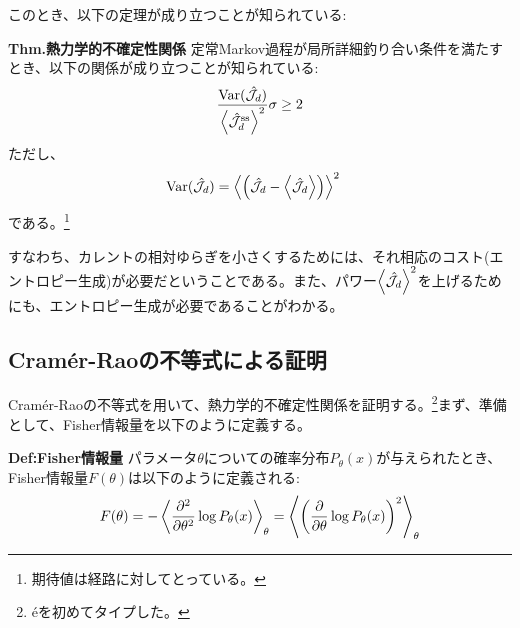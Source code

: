 \documentclass[a4paper,11pt]{jsarticle}
\numberwithin{equation}{section}
\begin{document}
このとき、以下の定理が成り立つことが知られている:

\begin{itembox}[l]{\textbf{Thm.熱力学的不確定性関係}}
    定常Markov過程が局所詳細釣り合い条件を満たすとき、以下の関係が成り立つことが知られている:
    \begin{align}
        \frac{\text{Var}(\hat{\mathcal{J}}_d)}{\ev{\hat{\mathcal{J}}_d^{\text{ss}}}^2} \sigma \geq 2
    \end{align}
    ただし、
    \begin{align}
        \text{Var}(\hat{\mathcal{J}}_d) &= \ev{\qty(\hat{\mathcal{J}}_d -\ev{\hat{\mathcal{J}_d}})}^2
    \end{align}
    である。\footnote{期待値は経路に対してとっている。}
\end{itembox}
すなわち、カレントの相対ゆらぎを小さくするためには、それ相応のコスト(エントロピー生成)が必要だということである。また、パワー$\ev{\hat{\mathcal{J}}_d}^2$を上げるためにも、エントロピー生成が必要であることがわかる。\\

\subsection{Cram\'er-Raoの不等式による証明}
Cram\'er-Raoの不等式を用いて、熱力学的不確定性関係を証明する。\footnote{\'eを初めてタイプした。}まず、準備として、Fisher情報量を以下のように定義する。
\begin{itembox}[l]{\textbf{Def:Fisher情報量}}
    パラメータ$\theta$についての確率分布$P_{\theta}(x)$が与えられたとき、Fisher情報量$F(\theta)$は以下のように定義される:
    \begin{align}
        F(\theta) = -\ev{\pdv[2]{\theta} \log P_{\theta}(x)}_{\theta} =\ev{\qty(\pdv{\theta} \log P_{\theta}(x))^2}_{\theta}
    \end{align}
\end{itembox}
\end{document}
